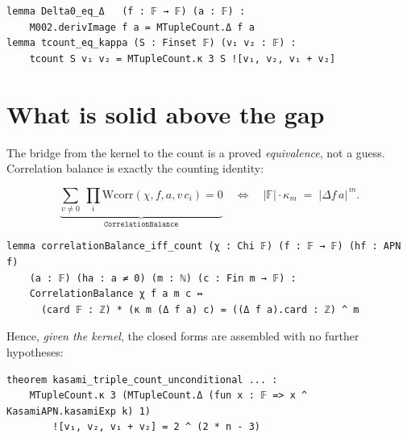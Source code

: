 \documentclass[11pt]{article}
\begin{document}
\begin{lstlisting}
lemma Delta0_eq_Δ   (f : 𝔽 → 𝔽) (a : 𝔽) :
    M002.derivImage f a = MTupleCount.Δ f a
lemma tcount_eq_kappa (S : Finset 𝔽) (v₁ v₂ : 𝔽) :
    tcount S v₁ v₂ = MTupleCount.κ 3 S ![v₁, v₂, v₁ + v₂]
\end{lstlisting}


\bigskip

\section{What is solid above the gap}

\noindent
The bridge from the kernel to the count is a proved \emph{equivalence}, not a
guess.  Correlation balance is exactly the counting identity:

\[
  \underbrace{\sum_{v\neq 0}\ \prod_i \mathrm{Wcorr}(\chi,f,a,v\,c_i)=0}
            _{\textstyle \texttt{CorrelationBalance}}
  \quad\Longleftrightarrow\quad
  |\mathbb{F}|\cdot \kappa_m \;=\; |\Delta f\,a|^{\,m}.
\]

\begin{lstlisting}
lemma correlationBalance_iff_count (χ : Chi 𝔽) (f : 𝔽 → 𝔽) (hf : APN f)
    (a : 𝔽) (ha : a ≠ 0) (m : ℕ) (c : Fin m → 𝔽) :
    CorrelationBalance χ f a m c ↔
      (card 𝔽 : ℤ) * (κ m (Δ f a) c) = ((Δ f a).card : ℤ) ^ m
\end{lstlisting}


\medskip

\noindent
Hence, \emph{given the kernel}, the closed forms are assembled with no further
hypotheses:

\begin{lstlisting}
theorem kasami_triple_count_unconditional ... :
    MTupleCount.κ 3 (MTupleCount.Δ (fun x : 𝔽 => x ^ KasamiAPN.kasamiExp k) 1)
        ![v₁, v₂, v₁ + v₂] = 2 ^ (2 * n - 3)
\end{lstlisting}

\end{document}
